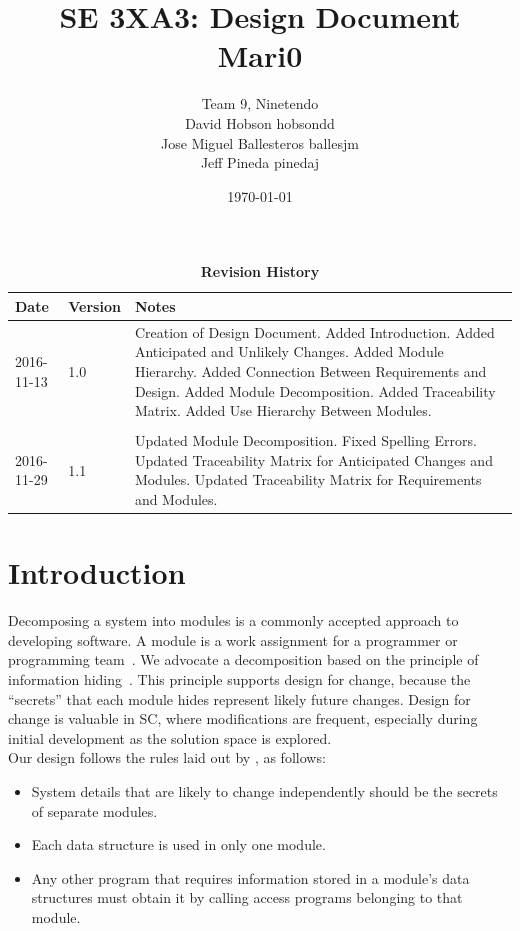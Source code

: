 \documentclass[12pt, titlepage]{article}
\title{SE 3XA3: Design Document\\Mari0}
\author{Team 9, Ninetendo
		\\ David Hobson hobsondd
		\\ Jose Miguel Ballesteros ballesjm
		\\ Jeff Pineda pinedaj
}
\date{\today}
\begin{document}
\maketitle

\tableofcontents
\listoftables
\listoffigures

\begin{table}[h]
\caption{\bf Revision History}
\begin{tabularx}{\textwidth}{p{3cm}p{2cm}X}
\toprule {\bf Date} & {\bf Version} & {\bf Notes}\\
\midrule
2016-11-13 & 1.0 & Creation of Design Document. Added Introduction. Added Anticipated and Unlikely Changes. Added Module Hierarchy. Added Connection Between Requirements and Design. Added Module Decomposition. Added Traceability Matrix. Added Use Hierarchy Between Modules.\\\\
2016-11-29 & 1.1 & Updated Module Decomposition. Fixed Spelling Errors. Updated Traceability Matrix for Anticipated Changes and Modules. Updated Traceability Matrix for Requirements and Modules.\\
\bottomrule
\end{tabularx}
\end{table}

\newpage


\section{Introduction}

Decomposing a system into modules is a commonly accepted approach to developing
software.  A module is a work assignment for a programmer or programming
team~\citep{ParnasEtAl1984}.  We advocate a decomposition
based on the principle of information hiding~\citep{Parnas1972a}.  This
principle supports design for change, because the ``secrets'' that each module
hides represent likely future changes.  Design for change is valuable in SC,
where modifications are frequent, especially during initial development as the
solution space is explored.\\  

Our design follows the rules laid out by \citet{ParnasEtAl1984}, as follows:
\begin{itemize}
\item System details that are likely to change independently should be the
  secrets of separate modules.
\item Each data structure is used in only one module.
\item Any other program that requires information stored in a module's data
  structures must obtain it by calling access programs belonging to that module.
\end{itemize}
\end{document}
